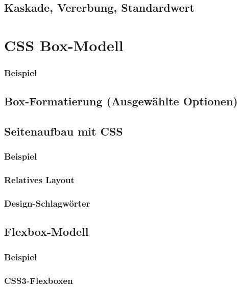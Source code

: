 \subsection{Kaskade, Vererbung, Standardwert}

\section{CSS Box-Modell}
\subsubsection*{Beispiel}
\subsection{Box-Formatierung (Ausgewählte Optionen)}

\subsection{Seitenaufbau mit CSS}
\subsubsection*{Beispiel}
\subsubsection{Relatives Layout}
\subsubsection{Design-Schlagwörter}

\subsection{Flexbox-Modell}
\subsubsection*{Beispiel}
\subsubsection{CSS3-Flexboxen}

